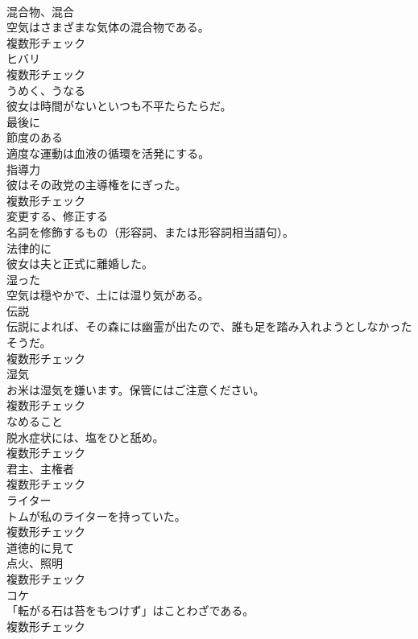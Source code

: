 \documentclass[8pt]{extreport}
\begin{document}
\begin{CJK}{UTF8}{min}
\\	[名詞]	混合物、混合	
\\	空気はさまざまな気体の混合物である。	
\\	複数形チェック
\\	[名詞]	ヒバリ	
\\	複数形チェック
\\	[動詞]	うめく、うなる	
\\	彼女は時間がないといつも不平たらたらだ。	
\\	[副詞]	最後に	
\\	[形容詞]	節度のある	
\\	適度な運動は血液の循環を活発にする。	
\\	[名詞]	指導力	
\\	彼はその政党の主導権をにぎった。	
\\	複数形チェック
\\	[動詞]	変更する、修正する	
\\	名詞を修飾するもの（形容詞、または形容詞相当語句）。	
\\	[副詞]	法律的に	
\\	彼女は夫と正式に離婚した。	
\\	[形容詞]	湿った	
\\	空気は穏やかで、土には湿り気がある。	
\\	[名詞]	伝説	
\\	伝説によれば、その森には幽霊が出たので、誰も足を踏み入れようとしなかったそうだ。	
\\	複数形チェック
\\	[名詞]	湿気	
\\	お米は湿気を嫌います。保管にはご注意ください。	
\\	複数形チェック
\\	[名詞]	なめること	
\\	脱水症状には、塩をひと舐め。	
\\	複数形チェック
\\	[名詞]	君主、主権者	
\\	複数形チェック
\\	[名詞]	ライター	
\\	トムが私のライターを持っていた。	
\\	複数形チェック
\\	[副詞]	道徳的に見て	
\\	[名詞]	点火、照明	
\\	複数形チェック
\\	[名詞]	コケ	
\\	「転がる石は苔をもつけず」はことわざである。	
\\	複数形チェック

\end{CJK}
\end{document}
